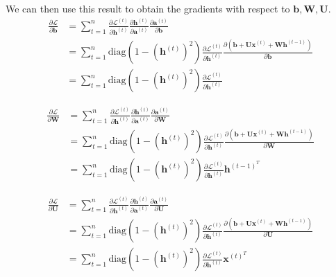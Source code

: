 \documentclass{article}
\numberwithin{equation}{section}
\begin{document}
We can then use this result to obtain the gradients with respect to $\bm{b}, \bm{W}, \bm{U}$.
\begin{equation}
\label{eqn:backward-b}
\begin{split}
	\frac{\partial \mathcal{L}}{\partial \bm{b}}
		&= \sum_{t=1}^{n} \frac{\partial \mathcal{L}^{(t)}}{\partial \bm{h}^{(t)}} \frac{\partial \bm{h}^{(t)}}{\partial \bm{a}^{(t)}} \frac{\partial \bm{a}^{(t)}}{\partial \bm{b}} \\
		&= \sum_{t=1}^{n} \text{diag}(1 - (\bm{h}^{(t)})^2) \frac{\partial \mathcal{L}^{(t)}}{\partial \bm{h}^{(t)}} \frac{\partial (\bm{b} + \bm{U}\bm{x}^{(t)} + \bm{W}\bm{h}^{(t-1)})}{\partial \bm{b}} \\
		&= \sum_{t=1}^{n} \text{diag}(1 - (\bm{h}^{(t)})^2) \frac{\partial \mathcal{L}^{(t)}}{\partial \bm{h}^{(t)}}
\end{split}
\end{equation}

\begin{equation}
\label{eqn:backward-W}
\begin{split}
	\frac{\partial \mathcal{L}}{\partial \bm{W}}
		&= \sum_{t=1}^{n} \frac{\partial \mathcal{L}^{(t)}}{\partial \bm{h}^{(t)}} \frac{\partial \bm{h}^{(t)}}{\partial \bm{a}^{(t)}} \frac{\partial \bm{a}^{(t)}}{\partial \bm{W}} \\
		&= \sum_{t=1}^{n} \text{diag}(1 - (\bm{h}^{(t)})^2) \frac{\partial \mathcal{L}^{(t)}}{\partial \bm{h}^{(t)}} \frac{\partial (\bm{b} + \bm{U}\bm{x}^{(t)} + \bm{W}\bm{h}^{(t-1)})}{\partial \bm{W}} \\
		&= \sum_{t=1}^{n} \text{diag}(1 - (\bm{h}^{(t)})^2) \frac{\partial \mathcal{L}^{(t)}}{\partial \bm{h}^{(t)}} \bm{h}^{(t-1)^T}
\end{split}
\end{equation}

\begin{equation}
\label{eqn:backward-U}
\begin{split}
	\frac{\partial \mathcal{L}}{\partial \bm{U}}
		&= \sum_{t=1}^{n} \frac{\partial \mathcal{L}^{(t)}}{\partial \bm{h}^{(t)}} \frac{\partial \bm{h}^{(t)}}{\partial \bm{a}^{(t)}} \frac{\partial \bm{a}^{(t)}}{\partial \bm{U}} \\
		&= \sum_{t=1}^{n} \text{diag}(1 - (\bm{h}^{(t)})^2) \frac{\partial \mathcal{L}^{(t)}}{\partial \bm{h}^{(t)}} \frac{\partial (\bm{b} + \bm{U}\bm{x}^{(t)} + \bm{W}\bm{h}^{(t-1)})}{\partial \bm{U}} \\
		&= \sum_{t=1}^{n} \text{diag}(1 - (\bm{h}^{(t)})^2) \frac{\partial \mathcal{L}^{(t)}}{\partial \bm{h}^{(t)}} \bm{x}^{(t)^T}
\end{split}
\end{equation}
\end{document}

